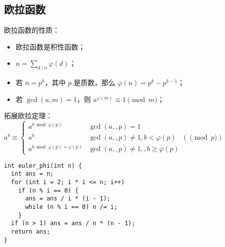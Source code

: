 \subsection{欧拉函数}
欧拉函数的性质：
\begin{itemize}
\item 欧拉函数是积性函数；
\item $n = \sum_{d \mid n}{\varphi(d)}$；
\item 若 $n = p^k$，其中 $p$ 是质数，那么 $\varphi(n) = p^k - p^{k - 1}$；
\item 若 $\gcd(a, m) = 1$，则 $a^{\varphi(m)} \equiv 1 \pmod{m}$；
\end{itemize}

拓展欧拉定理：
$a^b \equiv \begin{cases} a^{b\bmod\varphi(p)} &\gcd(a,,p)=1 \\
    a^b &\gcd(a,,p)\ne1, b<\varphi(p)\\
    a^{b\bmod\varphi(p)+\varphi(p)} &\gcd(a,,p)\ne1,,b\ge\varphi(p) \end{cases}
  (\pmod p)$

\begin{lstlisting}
int euler_phi(int n) {
  int ans = n;
  for (int i = 2; i * i <= n; i++)
    if (n % i == 0) {
      ans = ans / i * (i - 1);
      while (n % i == 0) n /= i;
    }
  if (n > 1) ans = ans / n * (n - 1);
  return ans;
}
\end{lstlisting}
